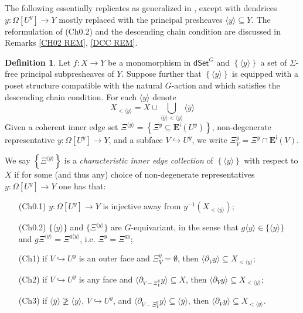 \documentclass[a4paper,10pt]{article}%
\numberwithin{equation}{section}
\numberwithin{figure}{section}
\theoremstyle{definition} %
\newtheorem{definition}[equation]{Definition}%
\newcommand{\1}{\ensuremath{\mathbbm 1}}%
\begin{document}
The following essentially replicates \cite[Def. 3.1]{BP_edss} as generalized in \cite[Rem. 3.7]{BP_edss},
except with dendrices
$y \colon \Omega[U^y] \to Y$
mostly replaced with the principal presheaves
$\langle y \rangle \subseteq Y$. 
The reformulation of (Ch0.2) and the descending chain condition
are discussed in Remarks \ref{CH02 REM}, \ref{DCC REM}.

\begin{definition}\label{CHAREDGE DEF}
	Let $f\colon X \to Y$ be a monomorphism in 
	$\mathsf{dSet}^G$ and 
	$\left\{ \langle y \rangle\right\}$
	a set of $\Sigma$-free principal subpresheaves of $Y$. 
	Suppose further that 
	$\left\{ \langle y \rangle \right\}$ is equipped 
	with a poset structure compatible with the natural $G$-action
	and which satisfies the descending chain condition.
	For each $\langle y \rangle$ denote
	\[
	X_{< \langle y \rangle} = X \cup 
	\bigcup_{\langle\bar{y}\rangle < \langle y \rangle} \langle \bar{y} \rangle
	\]
	Given a coherent inner edge set 
	$
	\Xi^{\langle y \rangle} =
	\left\{ \Xi^y \subseteq \boldsymbol{E}^{\mathsf{i}}(U^y)\right\}$,
	non-degenerate representative
	$y \colon \Omega[U^y] \to Y$, and a subface $V \hookrightarrow U^y$,
	we write
	$\Xi^y_V = \Xi^y \cap \boldsymbol{E}^{\mathsf{i}}(V)$.
	
	We say
	$
	\left\{ \Xi^{\langle y \rangle} \right \} 
	$
	is a \emph{characteristic inner edge collection} 
	of $\left\{ \langle y \rangle \right\}$ with respect to $X$ if
	for some (and thus any) choice of non-degenerate representatives
	$y\colon \Omega[U^y] \to Y$ one has that:
	\begin{enumerate}
		\item[(Ch0.1)] $y \colon \Omega[U^y] \to Y$ is injective away from
		$y^{-1}\left( X_{< \langle y \rangle} \right)$; 
		\item[(Ch0.2)]
		$\{\langle y\rangle\}$ and
		$\{\Xi^{\langle y \rangle}\}$ are $G$-equivariant, in the sense that
		$g\langle y\rangle \in \{\langle y\rangle\}$ and 
		$g \Xi^{\langle y \rangle} =
		\Xi^{g \langle y \rangle}$,
		i.e. $\Xi^y = \Xi^{gy}$;
		\item[(Ch1)] if $V \hookrightarrow U^y$ is an outer face and $\Xi^y_V = \emptyset$,
		then $\langle \partial_V y \rangle \subseteq X_{< \langle y \rangle}$;
		\item[(Ch2)] if $V \hookrightarrow U^y$ is any face and
		$\langle \partial_{V-\Xi^y_V} y\rangle \subseteq X$,
		then
		$\langle \partial_V y\rangle \subseteq X_{< \langle y \rangle}$;
		\item[(Ch3)] if $\langle \bar{y} \rangle \not \geq \langle y \rangle$,
		$V \hookrightarrow U^y$,
		and
		$\langle \partial_{V-\Xi^y_V} y\rangle \subseteq \langle \bar{y} \rangle$,
		then
		$\langle \partial_V y\rangle \subseteq X_{< \langle y \rangle}$.
	\end{enumerate}
\end{definition}
\end{document}
